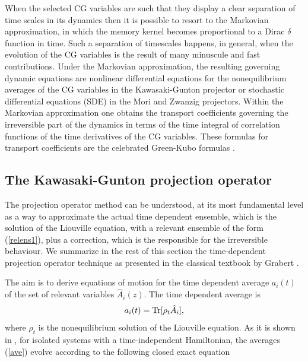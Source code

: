 \documentclass[b5paper,openright,10pt]{book}
\begin{document}
When the  selected CG  variables are  such that  they display  a clear
separation  of time  scales in  its dynamics  then it  is possible  to
resort  to the  Markovian  approximation, in  which  the memory  kernel
becomes proportional to  a Dirac $\delta$ function in time.   Such a separation
of  timescales  happens, in  general, when  the evolution  of the  CG
variables  is the  result of  many minuscule  and fast  contributions.
Under  the Markovian  approximation, the  resulting governing  dynamic
equations    are   nonlinear    differential   equations    for   the
nonequilibrium averages  of the  CG variables in  the Kawasaki-Gunton
projector or stochastic  differential equations (SDE) in  the Mori and
Zwanzig projectors.   Within the  Markovian approximation  one obtains
the  transport coefficients  governing  the irreversible  part of  the
dynamics in terms of the  time integral of correlation functions
  of the  time derivatives of  the CG variables.  These  formulas for
transport   coefficients  are   the  celebrated   Green-Kubo  formulas
\cite{Green1952,Kubo1957}.

\subsection{The Kawasaki-Gunton projection operator}
The projection operator method can be
understood, at its most fundamental level  as a way to approximate the
actual time dependent ensemble, which is the solution of the Liouville
equation, with a relevant  ensemble of the form (\ref{relens1}),
plus  a correction,  which  is the  responsible  for the  irreversible
behaviour. We  summarize   in  the   rest  of   this  section   the
time-dependent  projection  operator  technique as  presented  in  the
classical  textbook  by Grabert  \cite{Grabert1982}.   

The  aim is  to
derive equations of motion for  the time dependent average $a_i(t)$ of
the set of relevant variables $\hat{A}_i(z)$. The time dependent average
is
\begin{equation}
  a_i(t)={\rm Tr}[\rho_t\hat{A}_i],
  \label{ave}
\end{equation}
where $\rho_t$ is
the nonequilibrium solution of the Liouville equation. As it is shown
in  \cite{Grabert1982},  for  isolated systems  with a time-independent
Hamiltonian,  the   averages  (\ref{ave})  evolve  according   to  the
following closed exact equation
\end{document}

